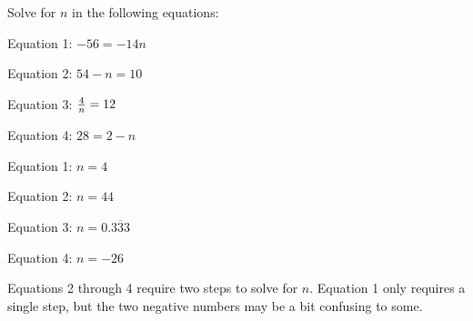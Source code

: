 

Solve for $n$ in the following equations:

\vskip 20pt

Equation 1: $-56 = -14n$

\vskip 10pt

Equation 2: $54 - n = 10$

\vskip 10pt

Equation 3: ${4 \over n} = 12$

\vskip 10pt

Equation 4: $28 = 2 - n$

\vskip 20pt







Equation 1: $n = 4$

\vskip 10pt

Equation 2: $n = 44$

\vskip 10pt

Equation 3: $n = 0.\overline{333}$

\vskip 10pt

Equation 4: $n = -26$







Equations 2 through 4 require two steps to solve for $n$.  Equation 1 only requires a single step, but the two negative numbers may be a bit confusing to some.




